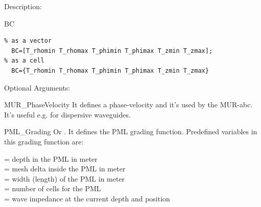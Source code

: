 \begin{FontDescr}{Description:}
\begin{FontPara}{BC}
	 \\
         \begin{lstlisting}
% as a vector
  BC=[T_rhomin T_rhomax T_phimin T_phimax T_zmin T_zmax];
% as a cell
  BC={T_rhomin T_rhomax T_phimin T_phimax T_zmin T_zmax}
	  \end{lstlisting}%
    \end{FontPara}
\end{FontDescr}

\begin{FontDescr}{Optional Arguments:}
    \begin{FontPara}{MUR\_PhaseVelocity}  \label{para:MUR_PhaseVelocity}
	It defines a phase-velocity and  it's used by the MUR-abc. It's useful e.g. for dispersive waveguides.
    \end{FontPara}
    \begin{FontPara}{PML\_Grading}  \label{para:PML_Grading}
	Or . It defines the PML grading function.\vspace{2mm}
			    Predefined variables in this grading function are:
			      \begin{myindentpar}
				  = depth in the PML in meter\\
				 = mesh delta inside the PML in meter\\
				  = width (length) of the PML in meter\\
				  = number of cells for the PML\\
				  = wave impedance at the current depth and position
			    \end{myindentpar}
    \end{FontPara}
\end{FontDescr}

